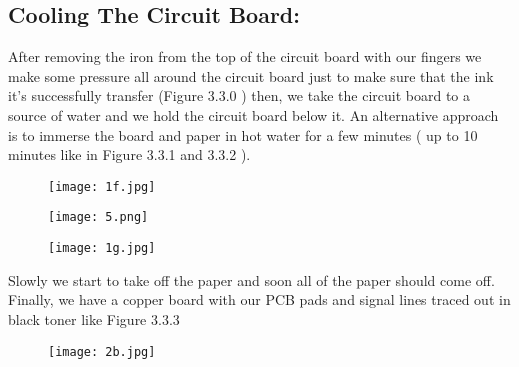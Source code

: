 \subsection{Cooling The Circuit Board:}

After removing the iron from the top of the circuit board with our fingers we make some pressure all around the circuit board just to make sure that the ink it's successfully transfer (Figure 3.3.0 ) then, we take the circuit board to a source of water and we hold the circuit board below it. An alternative approach is to immerse the board and paper in hot water for a few minutes ( up to 10 minutes like in Figure 3.3.1 and 3.3.2 ). \hfill \break

\begin{figure}[H]
\texttt{[image: 1f.jpg]}
\centering \linebreak {}
\end{figure}

\begin{figure}[H]
\texttt{[image: 5.png]}
\centering \linebreak {}
\end{figure}

\begin{figure}[H]
\texttt{[image: 1g.jpg]}
\centering \linebreak {}
\end{figure} \hfill \break

Slowly we start to take off the paper and soon all of the paper should come off. Finally, we have a copper board with our PCB pads and signal lines traced out in black toner like Figure 3.3.3 \hfill \break

\begin{figure}[H]
\texttt{[image: 2b.jpg]}
\centering \linebreak {}
\end{figure} \hfill \break
